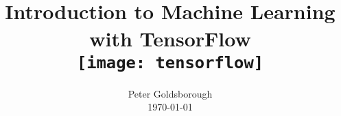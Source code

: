 





\begin{frame}[plain]
    \title{
      \vspace{1.2cm}\\
      Introduction to Machine Learning with TensorFlow\\
      \vspace{1cm}
      \texttt{[image: tensorflow]}}
    \author{
      Peter Goldsborough \\
      \vspace{0.5cm}
      \today
    }
    \titlepage
\end{frame}





\setcounter{page}{1}







